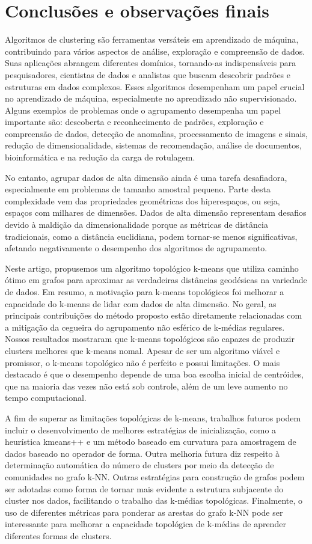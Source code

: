 \documentclass[sn-mathphys,Numbered]{sn-jnl}%
\theoremstyle{thmstyleone}%
\theoremstyle{thmstyletwo}%
\theoremstyle{thmstylethree}%
\begin{document}
\section{Conclusões e observações finais}

Algoritmos de clustering são ferramentas versáteis em aprendizado de máquina, contribuindo para vários aspectos de análise, exploração e compreensão de dados. Suas aplicações abrangem diferentes domínios, tornando-as indispensáveis para pesquisadores, cientistas de dados e analistas que buscam descobrir padrões e estruturas em dados complexos. Esses algoritmos desempenham um papel crucial no aprendizado de máquina, especialmente no aprendizado não supervisionado. Alguns exemplos de problemas onde o agrupamento desempenha um papel importante são: descoberta e reconhecimento de padrões, exploração e compreensão de dados, detecção de anomalias, processamento de imagens e sinais, redução de dimensionalidade, sistemas de recomendação, análise de documentos, bioinformática e na redução da carga de rotulagem.

No entanto, agrupar dados de alta dimensão ainda é uma tarefa desafiadora, especialmente em problemas de tamanho amostral pequeno. Parte desta complexidade vem das propriedades geométricas dos hiperespaços, ou seja, espaços com milhares de dimensões. Dados de alta dimensão representam desafios devido à maldição da dimensionalidade porque as métricas de distância tradicionais, como a distância euclidiana, podem tornar-se menos significativas, afetando negativamente o desempenho dos algoritmos de agrupamento.

Neste artigo, propusemos um algoritmo topológico k-means que utiliza caminho ótimo em grafos para aproximar as verdadeiras distâncias geodésicas na variedade de dados. Em resumo, a motivação para k-means topológicos foi melhorar a capacidade do k-means de lidar com dados de alta dimensão. No geral, as principais contribuições do método proposto estão diretamente relacionadas com a mitigação da cegueira do agrupamento não esférico de k-médias regulares. Nossos resultados mostraram que k-means topológicos são capazes de produzir clusters melhores que k-means nomal. Apesar de ser um algoritmo viável e promissor, o k-means topológico não é perfeito e possui limitações. O mais destacado é que o desempenho depende de uma boa escolha inicial de centróides, que na maioria das vezes não está sob controle, além de um leve aumento no tempo computacional.

A fim de superar as limitações topológicas de k-means, trabalhos futuros podem incluir o desenvolvimento de melhores estratégias de inicialização, como a heurística kmeans++ e um método baseado em curvatura para amostragem de dados baseado no operador de forma. Outra melhoria futura diz respeito à determinação automática do número de clusters por meio da detecção de comunidades no grafo k-NN. Outras estratégias para construção de grafos podem ser adotadas como forma de tornar mais evidente a estrutura subjacente do cluster nos dados, facilitando o trabalho das k-médias topológicas. Finalmente, o uso de diferentes métricas para ponderar as arestas do grafo k-NN pode ser interessante para melhorar a capacidade topológica de k-médias de aprender diferentes formas de clusters.
\end{document}
